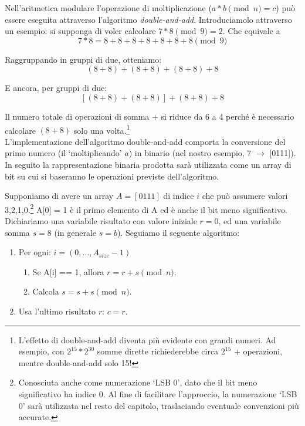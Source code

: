 Nell'aritmetica modulare l'operazione di moltiplicazione ($a*b \pmod n = c$) può essere eseguita attraverso l'algoritmo \emph{double-and-add}. Introduciamolo attraverso un esempio: si supponga di voler calcolare $7*8 \pmod 9 = 2$. Che equivale a  
\[7*8 = 8+8+8+8+8+8+8 \pmod 9\]

Raggruppando in gruppi di due, otteniamo: 
\[(8+8) + (8+8) + (8+8) + 8\]

E ancora, per gruppi di due:
\[[(8+8) + (8+8)] + (8+8) + 8\]

Il numero totale di operazioni di somma $+$ si riduce da 6 a 4 perché è necessario calcolare $(8+8)$ solo una volta.\footnote{L'effetto di double-and-add diventa più evidente con grandi numeri. Ad esempio, con $2^{15} * 2^{30}$ somme dirette richiederebbe circa $2^{15}$ $+$ operazioni, mentre double-and-add solo 15!}\\

L'implementazione dell'algoritmo double-and-add comporta la conversione del primo numero (il `moltiplicando' $a$) in binario (nel nostro esempio, 7 $\rightarrow$ [0111]). In seguito la rappresentazione binaria prodotta sarà utilizzata come un array di bit su cui si baseranno le operazioni previste dell'algoritmo. 

Supponiamo di avere un array $A = [0111]$ di indice $i$ che può assumere valori 3,2,1,0.\footnote{Conosciuta anche come numerazione `LSB 0', dato che il bit meno significativo ha indice 0. Al fine di facilitare l'approccio, la numerazione `LSB 0' sarà utilizzata nel resto del capitolo, traslaciando eventuale convenzioni più accurate.} A[0] = 1 è il primo elemento di A ed è anche il bit meno significativo. Dichiariamo una variabile risultato con valore iniziale $r = 0$, ed una variabile somma $s = 8$ (in generale $s = b$). Seguiamo il seguente algoritmo:
\begin{enumerate}
	\item Per ogni: $i = (0,...,A_{size} - 1)$
	\begin{enumerate}
		\item Se A[i] == 1, allora $r = r + s \pmod n$.
		\item Calcola $s = s + s \pmod n$.
	\end{enumerate}
	\item Usa l'ultimo risultato $r$: $c = r$.
\end{enumerate}

